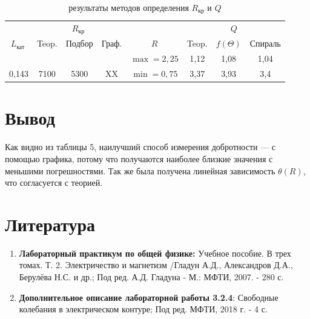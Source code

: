 \documentclass[a4paper, 12pt]{article}%
\begin{document}
\newpage 

\begin{table}[h!]
\begin{tabular}{|c||c|c|c||c|c|c|c|}
\hline \multicolumn{1}{|l||}{} & \multicolumn{3}{c||}{$R_{\text {кр }}$}  &  & \multicolumn{3}{|c|}{$Q$} \\
\cline { 2 - 4 } \cline { 6 - 8 }$L_{\text {кат }}$ & Teop. & Подбор & Граф. & $R$ & Teop. & $f(\Theta)$ & Спираль \\
\hline \hline & & & & $\max = 2,25$  & 1,12 & 1,08 & 1,04\\
0,143 & 7100 & 5300 & XX & $\min = 0,75$ & 3,37 & 3,93 & 3,4\\
\hline
\end{tabular}
\caption{результаты методов определения $R_{\text{кр}}$ и $Q$}
\end{table}

\newpage

\section{Вывод}

Как видно из таблицы 5, наилучший способ измерения добротности --- с помощью графика, потому что получаются наиболее близкие значения с меньшими погрешностями. Так же была получена линейная зависимость $\theta(R)$, что согласуется с теорией.

\section{Литература}

\begin{enumerate}
\item \textbf{Лабораторный практикум по общей физике:} Учебное пособие. В трех томах. Т. 2. Электричество и магнетизм /Гладун А.Д., Александров Д.А., Берулёва Н.С. и др.; Под ред. А.Д. Гладуна - М.: МФТИ, 2007. - 280 с.
\item \textbf{Дополнительное описание лабораторной работы 3.2.4}: Свободные колебания в электрическом контуре; Под ред. МФТИ, 2018 г. - 4 с.
\end{enumerate}

					
\end{document}
